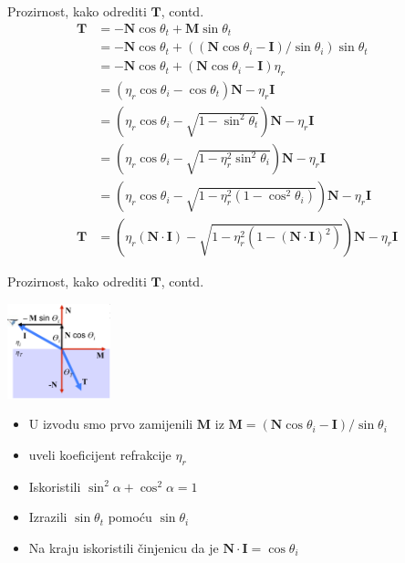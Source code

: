 \documentclass[9pt]{beamer}
\begin{document}
\begin{frame}{Prozirnost, kako odrediti $\mathbf{T}$, contd.}
\begin{align}
\mathbf{T} &= -\mathbf{N}\cos\theta_t + \mathbf{M}\sin\theta_t \\
&= -\mathbf{N}\cos\theta_t + ((\mathbf{N}\cos\theta_i - \mathbf{I})/\sin\theta_i)\sin\theta_t \\
&= -\mathbf{N}\cos\theta_t + (\mathbf{N}\cos\theta_i - \mathbf{I})\eta_r \\
&= \left(\eta_r\cos\theta_i - \cos\theta_t\right)\mathbf{N} - \eta_r\mathbf{I} \\
&= \left(\eta_r\cos\theta_i - \sqrt{1-\sin^2\theta_t}\right)\mathbf{N} - \eta_r\mathbf{I} \\
&= \left(\eta_r\cos\theta_i - \sqrt{1-\eta_r^2\sin^2\theta_i}\right)\mathbf{N} - \eta_r\mathbf{I} \\
&= \left(\eta_r\cos\theta_i - \sqrt{1-\eta_r^2(1-\cos^2\theta_i)}\right)\mathbf{N} - \eta_r\mathbf{I} \\
\mathbf{T} &= \left(\eta_r(\mathbf{N}\cdot \mathbf{I}) - \sqrt{1-\eta_r^2(1-(\mathbf{N}\cdot \mathbf{I})^2)}\right)\mathbf{N} - \eta_r\mathbf{I}
\end{align}
\end{frame}

\begin{frame}{Prozirnost, kako odrediti $\mathbf{T}$, contd.}
\begin{center}
\includegraphics[width=3cm]{slike/prozirnost_03.png}
\end{center}
\begin{itemize}
\item  U izvodu smo prvo zamijenili $\mathbf{M}$ iz $\mathbf{M} = (\mathbf{N}\cos\theta_i - \mathbf{I})/\sin\theta_i$
\item uveli koeficijent refrakcije $\eta_r$
\item Iskoristili $\sin^2 \alpha + \cos^2 \alpha= 1$
\item Izrazili $\sin \theta_t$ pomoću $\sin \theta_i$
\item Na kraju iskoristili činjenicu da je $\mathbf{N}\cdot \mathbf{I}= \cos\theta_i$
\end{itemize}

\end{frame}
\end{document}

